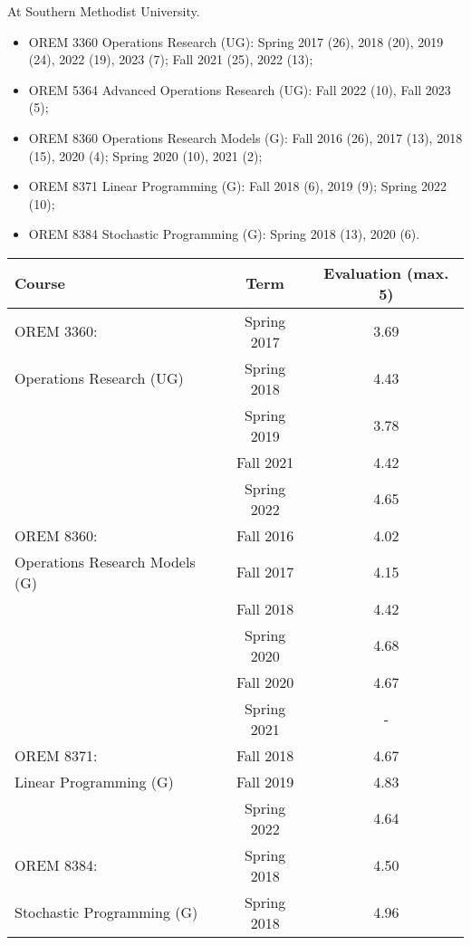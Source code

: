 \documentclass[hyperref, margin]{myResume}
\newif\ifpublic
\begin{document}
\begin{resume}
	At Southern Methodist University.
	\ifpublic
	\begin{itemize}
		\item OREM 3360 Operations Research (UG): Spring 2017 (26), 2018 (20), 2019 (24), 2022 (19), 2023 (7); Fall 2021 (25), 2022 (13);
		\item OREM 5364 Advanced Operations Research (UG): Fall 2022 (10), Fall 2023 (5);
		\item OREM 8360 Operations Research Models (G): Fall 2016 (26), 2017 (13), 2018 (15), 2020 (4); Spring 2020 (10), 2021 (2);
		\item OREM 8371 Linear Programming (G): Fall 2018 (6), 2019 (9); Spring 2022 (10);
		\item OREM 8384 Stochastic Programming (G): Spring 2018 (13), 2020 (6).
	\end{itemize}
	\else 	
	\begin{center}
		\renewcommand{\arraystretch}{1.3}
		\centering \begin{tabular}{|p{}|c|c|}
		\hline 
		Course & Term & Evaluation (max. 5) 	\\ \hline
		OREM 3360: 									& Spring 2017 	& 3.69 \\ \cline{2-3}
		Operations Research (UG)					& Spring 2018 	& 4.43 \\ \cline{2-3}
													& Spring 2019 	& 3.78 \\ \cline{2-3} 
													& Fall 2021		& 4.42 \\ \cline{2-3}
													& Spring 2022	& 4.65 \\ \hline
		OREM 8360: 									& Fall 2016 	& 4.02 \\ \cline{2-3}
		Operations Research Models (G)				& Fall 2017 	& 4.15 \\ \cline{2-3}
													& Fall 2018 	& 4.42 \\ \cline{2-3}
													& Spring 2020 	& 4.68 \\ \cline{2-3}
													& Fall 2020 	& 4.67 \\ \cline{2-3}
													& Spring 2021 	& - \\ \hline
		OREM 8371: 									& Fall 2018 	& 4.67 \\ \cline{2-3}
		Linear Programming (G)						& Fall 2019 	& 4.83 \\ \cline{2-3}
													& Spring 2022 	& 4.64 \\ \hline
		OREM 8384:									& Spring 2018 	& 4.50 \\ \cline{2-3}
		Stochastic Programming (G)					& Spring 2018 	& 4.96 \\ \hline
		\end{tabular}
	\end{center}
	

\end{resume}
\end{document}
